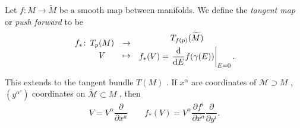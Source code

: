 \begin{definition}
  Let $f \colon M \to \widetilde{M}$  be a smooth map between manifolds.
  We define the \emph{tangent map} or \emph{push forward} to be
  \begin{equation}
    \begin{gathered}
      f_* \colon \\
      \qquad
    \end{gathered}
    \begin{gathered}
      T_p(M) \\
      V
    \end{gathered}
    \quad
    \begin{gathered}
      \to \\
      \mapsto
    \end{gathered}
    \quad
    \begin{gathered}
      T_{f(p)}(\widetilde{M}) \\
      f_*(V) = \left. \dv{E} f(\gamma(E)) \right\rvert_{E=0}.
    \end{gathered}
  \end{equation} 
\end{definition}

This extends to the tangent bundle $T (M)$ .
If $x^{\alpha}$  are coordinates of $\mathcal{M} \supset M$ , $(y^{\alpha'})$  coordinates on $\widetilde{\mathcal{M}} \subset M$ , then
\begin{equation}
  V = V^{\alpha} \frac{\partial }{\partial x^{a}} \qquad f_*(V) = V^{\alpha} \frac{\partial f^i}{\partial x^{a}} \frac{\partial }{\partial y^{i}}.
\end{equation}
